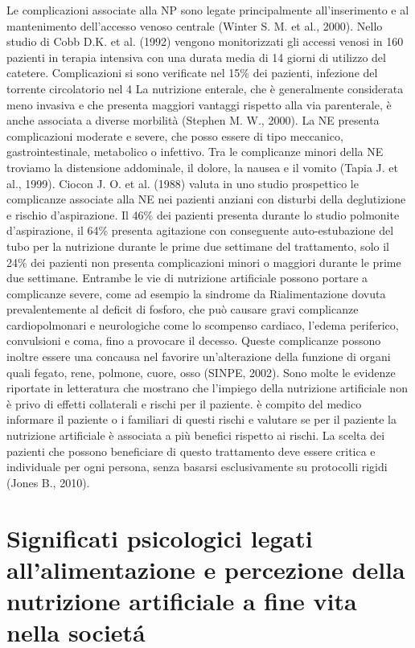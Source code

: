 \documentclass[11pt,a4paper,oneside]{book}
\begin{document}

Le complicazioni associate alla NP sono legate principalmente all'inserimento e al mantenimento dell'accesso venoso centrale (Winter S. M. et al., 2000). Nello studio di Cobb D.K. et al. (1992) vengono monitorizzati gli accessi venosi in 160 pazienti in terapia intensiva con una durata media di 14 giorni di utilizzo del catetere. Complicazioni si sono verificate nel 15\% dei pazienti, infezione del torrente circolatorio nel 4%
La nutrizione enterale, che \`e generalmente considerata meno invasiva e che presenta maggiori vantaggi rispetto alla via parenterale, \`e anche associata a diverse morbilit\`a (Stephen M. W., 2000). La NE presenta complicazioni moderate e severe, che posso essere di tipo meccanico, gastrointestinale, metabolico o infettivo. Tra le complicanze minori della NE troviamo la distensione addominale, il dolore, la nausea e il vomito (Tapia J. et al., 1999).
Ciocon J. O. et al. (1988) valuta in uno studio prospettico le complicanze associate alla NE nei pazienti anziani con disturbi della deglutizione e rischio d'aspirazione. Il 46\% dei pazienti presenta durante lo studio polmonite d'aspirazione, il 64\% presenta agitazione con conseguente auto-estubazione del tubo per la nutrizione durante le prime due settimane del trattamento, solo il 24\% dei pazienti non presenta complicazioni minori o maggiori durante le prime due settimane. 
Entrambe le vie di nutrizione artificiale possono portare a complicanze severe, come ad esempio la sindrome da Rialimentazione dovuta prevalentemente al deficit di fosforo, che pu\`o causare gravi complicanze cardiopolmonari e neurologiche come lo scompenso cardiaco, l'edema periferico, convulsioni e coma, fino a provocare il decesso. Queste complicanze possono inoltre essere una concausa nel favorire un'alterazione della funzione di organi quali fegato, rene, polmone, cuore, osso (SINPE, 2002).
Sono molte le evidenze riportate in letteratura che mostrano che l'impiego della nutrizione artificiale non \`e privo di effetti collaterali e rischi per il paziente. \`e compito del medico informare il paziente o i familiari di questi rischi e valutare se per il paziente la nutrizione artificiale \`e associata a pi\`u benefici rispetto ai rischi. La scelta dei pazienti che possono beneficiare di questo trattamento deve essere critica e individuale per ogni persona, senza basarsi esclusivamente su protocolli rigidi (Jones B., 2010).

\chapter{Significati psicologici legati all'alimentazione e percezione della nutrizione artificiale a fine vita nella societ\'a}
\label{sec:SignificatiPsicologici}
\end{document}
